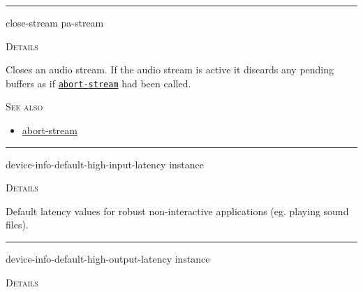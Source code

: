 \documentclass[a4paper]{report}
\begin{document}
  

    \rule{\linewidth}{0.1mm}
    
    \label{portaudio__fun__close-stream}
    \begin{defun}[Function]
    close-stream pa-stream


	
    \bigskip
    \textsc{Details}

Closes an audio stream. If the audio stream is active it discards any pending buffers as if \hyperref[portaudio__fun__abort-stream]{\texttt{abort-stream}}
   had been called.


      
    \bigskip
    \textsc{See also}


	
    \begin{itemize}
    
	  
    \item
    \hyperref[portaudio__fun__abort-stream]{abort-stream}
    
	
    \end{itemize}
  
      


    
    \end{defun}
  
  

    \rule{\linewidth}{0.1mm}
    
    \label{portaudio__fun__device-info-default-high-input-latency}
    \begin{defun}[Function]
    device-info-default-high-input-latency instance


	
    \bigskip
    \textsc{Details}

Default latency values for robust non-interactive applications (eg. playing sound files).


    
    \end{defun}
  
  

    \rule{\linewidth}{0.1mm}
    
    \label{portaudio__fun__device-info-default-high-output-latency}
    \begin{defun}[Function]
    device-info-default-high-output-latency instance


	
    \bigskip
    \textsc{Details}




    
    \end{defun}
  
\end{document}
